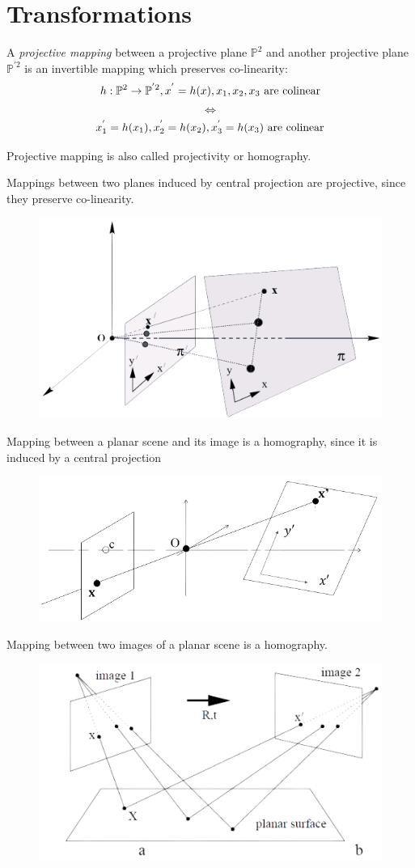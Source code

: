 \section{Transformations}

\begin{definition}
    A \emph{projective mapping} between a projective plane $\mathbb{P}^2$ and another projective plane $\mathbb{P}^{'2}$ is an invertible mapping which preserves co-linearity:
    \[h:\mathbb{P}^2 \rightarrow \mathbb{P}^{'2}, x^{'}=h(x),x_1,x_2,x_3 \textnormal{ are colinear}\]
    \[\Leftrightarrow\]
    \[x_1^{'}=h(x_1),x_2^{'}=h(x_2),x_3^{'}=h(x_3) \textnormal{ are colinear}\]
\end{definition}
Projective mapping is also called projectivity or homography. 
\begin{example}
    Mappings between two planes induced by central projection are projective, since they preserve co-linearity. 
    \begin{figure}[H]
        \centering
        \includegraphics[width=0.4\linewidth]{images/map1.png}
    \end{figure}
    Mapping between a planar scene and its image is a homography, since it is induced by a central projection
    \begin{figure}[H]
        \centering
        \includegraphics[width=0.4\linewidth]{images/map2.png}
    \end{figure}
    Mapping between two images of a planar scene is a homography.
    \begin{figure}[H]
        \centering
        \includegraphics[width=0.4\linewidth]{images/map3.png}

\end{figure}
\end{example}
